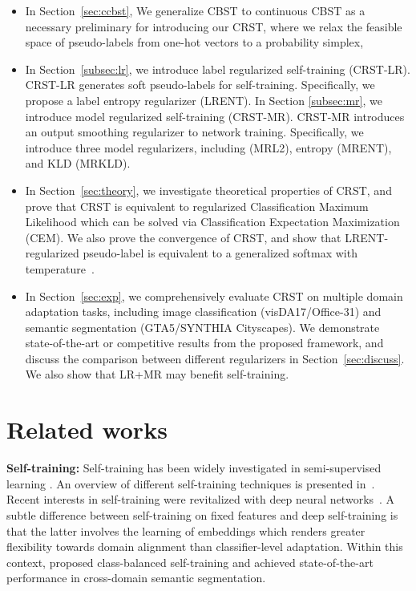 \documentclass[10pt,twocolumn,letterpaper]{article}
\theoremstyle{plain}
\begin{document}
\begin{itemize}[noitemsep,topsep=0pt]
\item In Section~\ref{sec:ccbst}, We generalize CBST to continuous CBST as a necessary preliminary for introducing our CRST, where we relax the feasible space of pseudo-labels from one-hot vectors to a probability simplex, 
\item In Section~\ref{subsec:lr}, we introduce label regularized self-training (CRST-LR). CRST-LR generates soft pseudo-labels for self-training. Specifically, we propose a label entropy regularizer (LRENT). In Section \ref{subsec:mr}, we introduce model regularized self-training (CRST-MR). CRST-MR introduces an output smoothing regularizer to network training. Specifically, we introduce three model regularizers, including  (MRL2), entropy (MRENT), and KLD (MRKLD).
\item In Section~\ref{sec:theory}, we investigate theoretical properties of CRST, and prove that CRST is equivalent to regularized Classification Maximum Likelihood which can be solved via Classification Expectation Maximization (CEM). We also prove the convergence of CRST, and show that LRENT-regularized pseudo-label is equivalent to a generalized softmax with temperature~\cite{hinton2015distilling}.
\item In Section~\ref{sec:exp}, we comprehensively evaluate CRST on multiple domain adaptation tasks, including image classification (visDA17/Office-31) and semantic segmentation (GTA5/SYNTHIA  Cityscapes). We demonstrate state-of-the-art or competitive results from the proposed framework, and discuss the comparison between different regularizers in Section~\ref{sec:discuss}. We also show that LR+MR may benefit self-training.
\end{itemize}

\section{Related works}\label{sec:related}
\noindent\textbf{Self-training: } Self-training has been widely investigated in semi-supervised learning \cite{yarowsky1995unsupervised,amini2002semi,grandvalet2005semi}. An overview of different self-training techniques is presented in~\cite{triguero2015self}. Recent interests in self-training were revitalized with deep neural networks~\cite{lee2013pseudo}. A subtle difference between self-training on fixed features and deep self-training is that the latter involves the learning of embeddings which renders greater flexibility towards domain alignment than classifier-level adaptation. Within this context, \cite{Zou_2018_ECCV} proposed class-balanced self-training and achieved state-of-the-art performance in cross-domain semantic segmentation.
\end{document}
